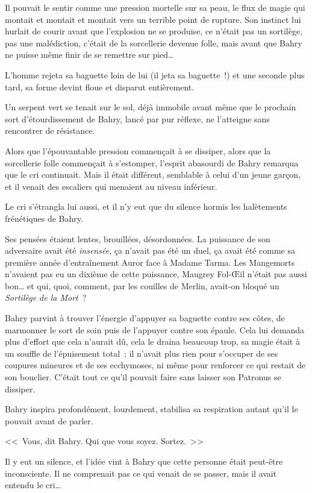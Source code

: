 Il pouvait le sentir comme une pression mortelle sur sa peau, le flux de magie qui montait et montait et montait vers un terrible point de rupture. Son instinct lui hurlait de courir avant que l'explosion ne se produise, ce n'était pas un sortilège, pas une malédiction, c'était de la sorcellerie devenue folle, mais avant que Bahry ne puisse même finir de se remettre sur pied…

L'homme rejeta sa baguette loin de lui (il jeta sa baguette~!) et une seconde plus tard, sa forme devint floue et disparut entièrement.

Un serpent vert se tenait sur le sol, déjà immobile avant même que le prochain sort d'étourdissement de Bahry, lancé par pur réflexe, ne l'atteigne sans rencontrer de résistance.

Alors que l'épouvantable pression commençait à se dissiper, alors que la sorcellerie folle commençait à s'estomper, l'esprit abasourdi de Bahry remarqua que le cri continuait. Mais il était différent, semblable à celui d'un jeune garçon, et il venait des escaliers qui menaient au niveau inférieur.

Le cri s'étrangla lui aussi, et il n'y eut que du silence hormis les halètements frénétiques de Bahry.

Ses pensées étaient lentes, brouillées, désordonnées. La puissance de son adversaire avait été \emph{insensée}, ça n'avait pas été un duel, ça avait été comme sa première année d'entraînement Auror face à Madame Tarma. Les Mangemorts n'avaient pas eu un dixième de cette puissance, Maugrey Fol-Œil n'était pas aussi bon… et qui, quoi, comment, par les couilles de Merlin, avait-on bloqué un \emph{Sortilège de la Mort}~?

Bahry parvint à trouver l'énergie d'appuyer sa baguette contre ses côtes, de marmonner le sort de soin puis de l'appuyer contre son épaule. Cela lui demanda plus d'effort que cela n'aurait dû, cela le draina beaucoup trop, sa magie était à un souffle de l'épuisement total~; il n'avait plus rien pour s'occuper de ses coupures mineures et de ses ecchymoses, ni même pour renforcer ce qui restait de son bouclier. C'était tout ce qu'il pouvait faire sans laisser son Patronus se dissiper.

Bahry inspira profondément, lourdement, stabilisa sa respiration autant qu'il le pouvait avant de parler.

<<~Vous, dit Bahry. Qui que vous soyez. Sortez.~>>

Il y eut un silence, et l'idée vint à Bahry que cette personne était peut-être inconsciente. Il ne comprenait pas ce qui venait de se passer, mais il avait entendu le cri…

